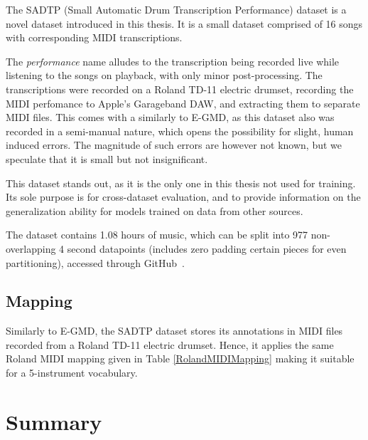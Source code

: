 The SADTP (Small Automatic Drum Transcription Performance) dataset is a novel dataset introduced in this thesis. It is a small dataset comprised of 16 songs with corresponding MIDI transcriptions. 

The \textit{performance} name alludes to the transcription being recorded live while listening to the songs on playback, with only minor post-processing. The transcriptions were recorded on a Roland TD-11 electric drumset, recording the MIDI perfomance to Apple's Garageband \gls{DAW}, and extracting them to separate MIDI files. This comes with a similarly to E-GMD, as this dataset also was recorded in a semi-manual nature, which opens the possibility for slight, human induced errors. The magnitude of such errors are however not known, but we speculate that it is small but not insignificant.

This dataset stands out, as it is the only one in this thesis not used for training. Its sole purpose is for cross-dataset evaluation, and to provide information on the generalization ability for models trained on data from other sources.

The dataset contains 1.08 hours of music, which can be split into 977 non-overlapping 4 second datapoints (includes zero padding certain pieces for even partitioning), accessed through GitHub~\cite{fosse_sadtp_2025}.

\subsection{Mapping}

Similarly to E-GMD, the SADTP dataset stores its annotations in MIDI files recorded from a Roland TD-11 electric drumset. Hence, it applies the same Roland MIDI mapping given in Table \ref{RolandMIDIMapping} making it suitable for a 5-instrument vocabulary.

\section{Summary}

